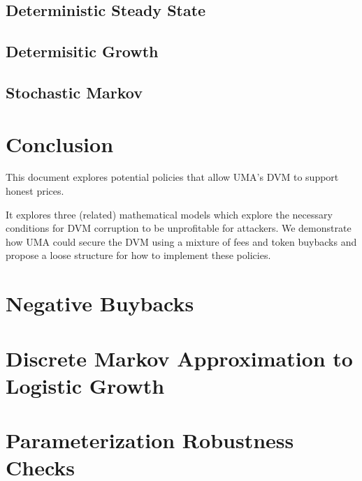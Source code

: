 \documentclass[12pt]{article}
\begin{document}
  \subsection{Deterministic Steady State} \label{sec:dss}
    

  \subsection{Determisitic Growth} \label{sec:dg}
    

  \subsection{Stochastic Markov} \label{sec:sm}
    

\section{Conclusion}

This document explores potential policies that allow UMA's DVM to support honest prices.

It explores three (related) mathematical models which explore the necessary conditions for DVM
corruption to be unprofitable for attackers. We demonstrate how UMA could secure the DVM using a
mixture of fees and token buybacks and propose a loose structure for how to implement these
policies.


\appendix

\section{Negative Buybacks} \label{app:nbb}
  

\section{Discrete Markov Approximation to Logistic Growth} \label{app:dmc}
  

\section{Parameterization Robustness Checks} \label{app:robustness}
  
\end{document}
